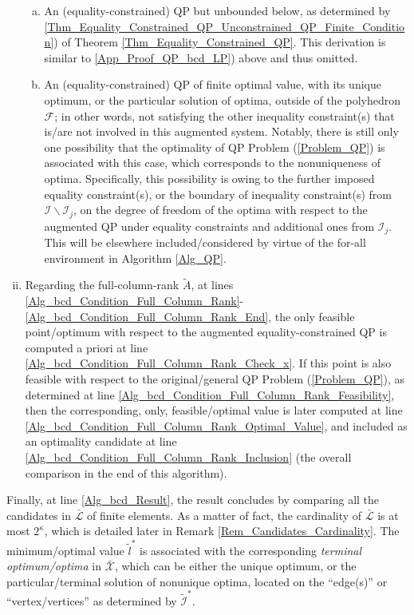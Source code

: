 \documentclass{imaman}
\newcommand{\calF}{{\mathcal F}}
\newcommand{\calI}{{\mathcal I}}
\newcommand{\calL}{{\mathcal L}}
\newcommand{\calX}{{\mathcal X}}
\numberwithin{equation}{section}
\begin{document}
\begin{enumerate}[i)]
\begin{enumerate}[a)]
    \item An (equality-constrained) QP but unbounded below, as determined by \ref{Thm_Equality_Constrained_QP_Unconstrained_QP_Finite_Condition}) of Theorem \ref{Thm_Equality_Constrained_QP}. This derivation is similar to \ref{App_Proof_QP_bcd_LP}) above and thus omitted.
    \item\label{App_Proof_QP_bcd_QP_bounded} An (equality-constrained) QP of finite optimal value, with its unique optimum, or the particular solution of optima, outside of the polyhedron $\calF$; in other words, not satisfying the other inequality constraint(s) that is/are not involved in this augmented system. Notably, there is still only one possibility that the optimality of QP Problem (\ref{Problem_QP}) is associated with this case, which corresponds to the nonuniqueness of optima. Specifically, this possibility is owing to the further imposed equality constraint(s), or the boundary of inequality constraint(s) from $\calI\backslash\calI_j$, on the degree of freedom of the optima with respect to the augmented QP under equality constraints and additional ones from $\calI_j$. This will be elsewhere included/considered by virtue of the for-all environment in Algorithm \ref{Alg_QP}.
    \end{enumerate}
\item Regarding the full-column-rank $\tilde A$, at lines \ref{Alg_bcd_Condition_Full_Column_Rank}-\ref{Alg_bcd_Condition_Full_Column_Rank_End}, the only feasible point/optimum with respect to the augmented equality-constrained QP is computed a priori at line \ref{Alg_bcd_Condition_Full_Column_Rank_Check_x}. If this point is also feasible with respect to the original/general QP Problem (\ref{Problem_QP}), as determined at line \ref{Alg_bcd_Condition_Full_Column_Rank_Feasibility}, then the corresponding, only, feasible/optimal value is later computed at line \ref{Alg_bcd_Condition_Full_Column_Rank_Optimal_Value}, and included as an optimality candidate at line \ref{Alg_bcd_Condition_Full_Column_Rank_Inclusion} (the overall comparison in the end of this algorithm).
\end{enumerate}

Finally, at line \ref{Alg_bcd_Result}, the result concludes by comparing all the candidates in $\bar\calL$ of finite elements. As a matter of fact, the cardinality of $\bar\calL$ is at most $2^\kappa$, which is detailed later in Remark \ref{Rem_Candidates_Cardinality}. The minimum/optimal value $\tilde l^*$ is associated with the corresponding \textit{terminal optimum/optima} in $\bar\calX$, which can be either the unique optimum, or the particular/terminal solution of nonunique optima, located on the ``edge(s)'' or ``vertex/vertices'' as determined by $\tilde\calI^*$.
\end{document}
